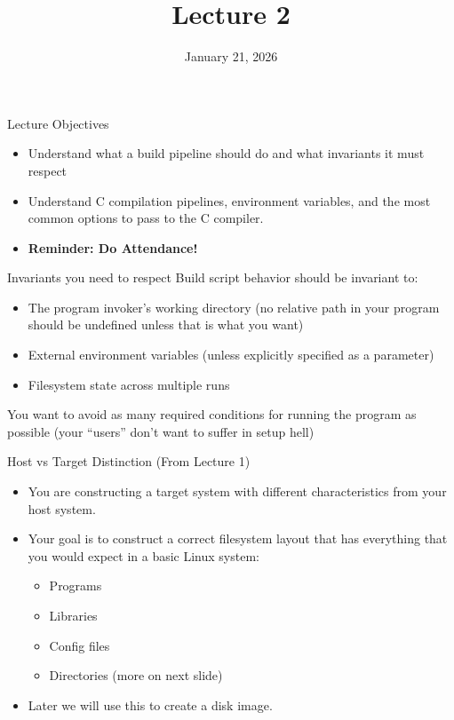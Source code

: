 \documentclass{../lecture}
\title{Lecture 2}
\date{January 21, 2026}
\begin{document}
\maketitle

\begin{frame}{Lecture Objectives}
  \begin{itemize}
    \item Understand what a build pipeline should do and what invariants it must respect
    \item Understand C compilation pipelines, environment variables, and the
      most common options to pass to the C compiler.
    \item \textbf{Reminder: Do Attendance!}
  \end{itemize}
\end{frame}

\begin{frame}{Invariants you need to respect}
  Build script behavior should be invariant to:
  \begin{itemize}
    \item The program invoker's working directory (no relative path in your
      program should be undefined unless that is what you want)
    \item External environment variables (unless explicitly specified as a
      parameter)
    \item Filesystem state across multiple runs
  \end{itemize}
  You want to avoid as many required conditions for running the program as
  possible (your ``users'' don't want to suffer in setup hell)
\end{frame}

\begin{frame}{Host vs Target Distinction (From Lecture 1)}
  \begin{itemize}
    \item You are constructing a target system with different characteristics
      from your host system.
    \item Your goal is to construct a correct filesystem layout that has
      everything that you would expect in a basic Linux system:
      \begin{itemize}
        \item Programs
        \item Libraries
        \item Config files
        \item Directories (more on next slide)
      \end{itemize}
    \item Later we will use this to create a disk image.
  \end{itemize}
\end{frame}
\end{document}
